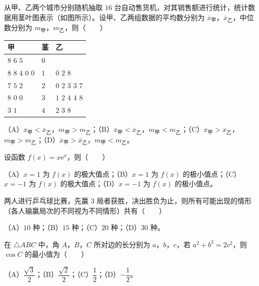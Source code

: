 \begin{question}
从甲、乙两个城市分别随机抽取 $16$ 台自动售货机，对其销售额进行统计，统计数据用茎叶图表示（如图所示）。设甲、乙两组数据的平均数分别为 $\overline x_\text{甲}$，$\overline x_\text{乙}$，中位数分别为 $m_\text{甲}$，$m_\text{乙}$，则\mbox{（　　）}

\begin{center}
\begin{tabular}{lll}
\toprule
甲 & 茎 & 乙 \\
\midrule
$8$ $6$ $5$ & $0$ &  \\
$8$ $8$ $4$ $0$ $0$ & $1$ & $0$ $2$ $8$ \\
$7$ $5$ $2$ & $2$ & $0$ $2$ $3$ $3$ $7$ \\
$8$ $0$ $0$ & $3$ & $1$ $2$ $4$ $4$ $8$ \\
$3$ $1$ & $4$ & $2$ $3$ $8$ \\
\bottomrule
\end{tabular}
\end{center}

（A）$\overline x_\text{甲}<\overline x_\text{乙}$，$m_\text{甲}>m_\text{乙}$；（B）$\overline x_\text{甲}<\overline x_\text{乙}$，$m_\text{甲}<m_\text{乙}$；（C）$\overline x_\text{甲}>\overline x_\text{乙}$，$m_\text{甲}>m_\text{乙}$；（D）$\overline x_\text{甲}>\overline x_\text{乙}$，$m_\text{甲}<m_\text{乙}$。

\end{question}
\begin{question}
设函数 $f(x)=x\mathrm e^x$，则\mbox{（　　）}

（A）$x=1$ 为 $f(x)$ 的极大值点；（B）$x=1$ 为 $f(x)$ 的极小值点；（C）$x=-1$ 为 $f(x)$ 的极大值点；（D）$x=-1$ 为 $f(x)$ 的极小值点。

\end{question}
\begin{question}
两人进行乒乓球比赛，先赢 $3$ 局者获胜，决出胜负为止，则所有可能出现的情形（各人输赢局次的不同视为不同情形）共有\mbox{（　　）}

（A）$10$ 种；（B）$15$ 种；（C）$20$ 种；（D）$30$ 种。

\end{question}
\begin{question}
在 $\triangle ABC$ 中，角 $A$，$B$，$C$ 所对边的长分别为 $a$，$b$，$c$，若 $a^2+b^2=2c^2$，则 $\cos C$ 的最小值为\mbox{（　　）}

（A）$\dfrac{\sqrt3}2$；（B）$\dfrac{\sqrt2}2$；（C）$\dfrac12$；（D）$-\dfrac12$。

\Needspace{0.4\textheight}
\end{question}
